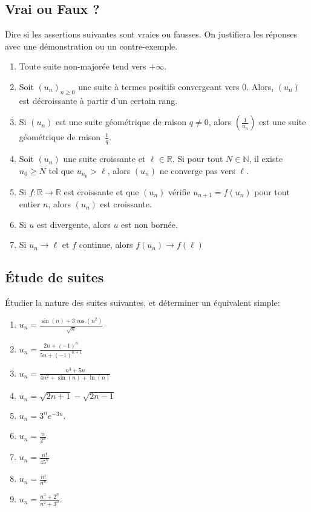 \vspace{1em}

\newpage
  \subsection{Vrai ou Faux ?}
  Dire si les assertions suivantes sont vraies ou fausses. On justifiera les réponses avec une démonstration ou un contre-exemple.
  \begin{enumerate}[label = $\square$]
    \item Toute suite non-majorée tend vers $+\infty$.
    \item Soit $\left(u_n\right)_{n \geq 0}$ une suite à termes positifs convergeant vers $0$. Alors, $(u_n)$ est décroissante à partir d'un certain rang.
    \item Si $(u_n)$ est une suite géométrique de raison $q \neq 0$, alors $\left(\frac{1}{u_n}\right)$ est une suite géométrique de raison~$\frac{1}{q}$.
    \item Soit $(u_n)$ une suite croissante et $\ell \in \mathbb{R}$. Si pour tout $N \in \mathbb{N}$, il existe $n_0 \geq N$ tel que $u_{n_0} > \ell$, alors $(u_n)$ ne converge pas vers $\ell$.
    \item Si $f: \mathbb{R} \rightarrow \mathbb{R}$ est croissante et que $(u_n)$ vérifie $u_{n+1}=f\left(u_n\right)$ pour tout entier $n$,  alors $(u_n)$ est croissante.
    \item Si $u$ est divergente, alors $u$ est non bornée.
    \item Si $u_n\to \ell$ et $f$ continue, alors $f(u_n)\to f(\ell)$
  \end{enumerate}

  \vspace{1em}


  \subsection{Étude de suites}
  Étudier la nature des suites suivantes, et déterminer un équivalent simple:
  \begin{multicols}{3}
  \begin{enumerate}[label = \alph*), itemsep = 0.5em]
    \item $\displaystyle u_n=\frac{\sin (n)+3 \cos \left(n^2\right)}{\sqrt{n}}$
    \item $\displaystyle u_n=\frac{2 n+(-1)^n}{5 n+(-1)^{n+1}}$
    \item $\displaystyle u_n=\frac{n^3+5 n}{4 n^2+\sin (n)+\ln (n)}$
    \item $\displaystyle u_n=\sqrt{2 n+1}-\sqrt{2 n-1}$
    \item $\displaystyle u_n=3^n e^{-3 n}$.
    \item $\displaystyle u_n=\frac{n}{2^n}$
    \item $\displaystyle u_n=\frac{n!}{45^n}$
    \item $\displaystyle u_n=\frac{n!}{n^n}$
    \item $\displaystyle u_n=\frac{n^3+2^n}{n^2+3^n}$.
  \end{enumerate}
  \end{multicols}


